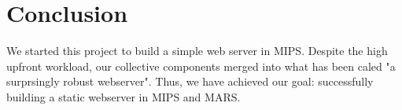 \documentclass[journal,10pt]{IEEEtran}
\begin{document}
%






\section{Conclusion}
We started this project to build a simple web server in MIPS. Despite the
high upfront workload, our collective components merged into what has been caled
"a surprsingly robust webserver". Thus, we have achieved our goal: successfully
building a static webserver in MIPS and MARS.


\appendices

\end{document}
